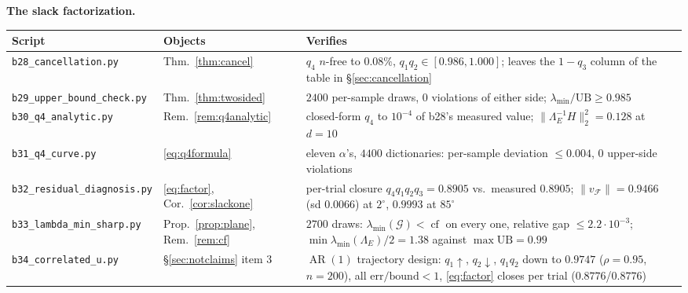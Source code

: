 \documentclass[11pt]{article}
\theoremstyle{remark}
\newcommand{\Gr}{\mathcal{G}}
\newcommand{\Le}{\Lambda_E}
\begin{document}
\noindent\textbf{The slack factorization.}
\begin{center}\footnotesize\begin{tabular}{@{}>{\raggedright\arraybackslash}p{5.1cm}%
>{\raggedright\arraybackslash}p{2.5cm}>{\raggedright\arraybackslash}p{5.8cm}@{}}
\toprule Script & Objects & Verifies\\
\midrule
\texttt{b28\_cancellation.py} & Thm.~\ref{thm:cancel} & $q_4$ $n$-free to $0.08\%$,
$q_1q_2\in[0.986,1.000]$; leaves the $1-q_3$ column of the table in
\S\ref{sec:cancellation}\\
\texttt{b29\_upper\_bound\_check.py} & Thm.~\ref{thm:twosided} & $2400$ per-sample
draws, $0$ violations of either side; $\lambda_{\min}/\mathrm{UB}\ge0.985$\\
\texttt{b30\_q4\_analytic.py} & Rem.~\ref{rem:q4analytic} & closed-form $q_4$ to
$10^{-4}$ of b28's measured value; $\|\Le^{-1}H\|_2^2=0.128$ at $d=10$\\
\texttt{b31\_q4\_curve.py} & \eqref{eq:q4formula} & eleven $\alpha$'s, $4400$
dictionaries: per-sample deviation $\le0.004$, $0$ upper-side violations\\
\texttt{b32\_residual\_diagnosis.py} & \eqref{eq:factor}, Cor.~\ref{cor:slackone} &
per-trial closure $q_4q_1q_2q_3=0.8905$ vs.\ measured $0.8905$;
$\|v_{\mathcal F}\|=0.9466$ (sd $0.0066$) at $2^\circ$, $0.9993$ at $85^\circ$\\
\texttt{b33\_lambda\_min\_sharp.py} & Prop.~\ref{prop:plane}, Rem.~\ref{rem:cf} & $2700$ draws:
$\lambda_{\min}(\Gr)<\operatorname{cf}$ on every one, relative gap
$\le2.2\cdot10^{-3}$; $\min\lambda_{\min}(\Le)/2=1.38$ against $\max\mathrm{UB}=0.99$\\
\texttt{b34\_correlated\_u.py} & \S\ref{sec:notclaims} item 3 & $\operatorname{AR}(1)$
trajectory design: $q_1\uparrow$, $q_2\downarrow$, $q_1q_2$ down to $0.9747$
($\rho=0.95$, $n=200$), all $\mathrm{err}/\mathrm{bound}<1$, \eqref{eq:factor} closes per
trial ($0.8776$/$0.8776$)\\
\bottomrule
\end{tabular}\end{center}
\end{document}
